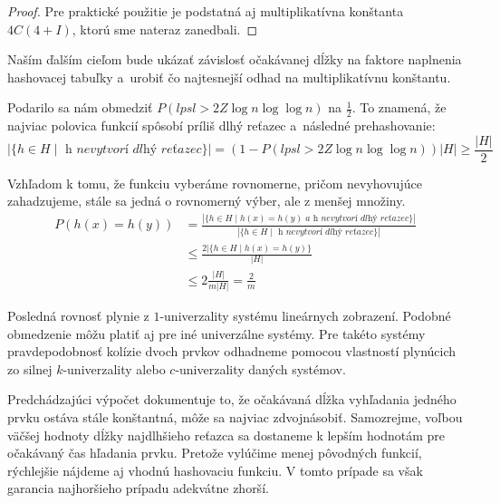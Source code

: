 \begin{proof}
Pre praktické použitie je podstatná aj multiplikatívna konštanta $4C(4 + I)$, ktorú sme nateraz zanedbali.
\end{proof}

Naším ďalším cieľom bude ukázať závislosť očakávanej dĺžky na faktore naplnenia hashovacej tabuľky a~urobiť čo najtesnejší odhad na multiplikatívnu konštantu.

Podarilo sa nám obmedziť $P(lpsl > 2Z \log n \log \log n)$ na $\frac{1}{2}$. To znamená, že najviac polovica funkcií spôsobí príliš dlhý reťazec a~následné prehashovanie:
\begin{displaymath}
|\lbrace h \in H \mid \textit{ h nevytvorí dlhý reťazec} \rbrace| = \left(1 - P(lpsl > 2Z \log n \log \log n)\right) |H| \geq \frac{|H|}{2}
\end{displaymath}

Vzhľadom k tomu, že funkciu vyberáme rovnomerne, pričom nevyhovujúce zahadzujeme, stále sa jedná o rovnomerný výber, ale z menšej množiny.
\begin{displaymath}
\begin{split}
P(h(x) = h(y)) 
	& =  \frac{|\lbrace h \in H \mid h(x) = h(y) \textit{ a~h nevytvorí dlhý reťazec} \rbrace |}{|\lbrace h \in H \mid \textit{ h nevytvorí dlhý reťazec} \rbrace|} \\
	& \leq \frac{2 |\lbrace h \in H \mid h(x) = h(y) \rbrace}{|H|} \\
	& \leq 2 \frac{|H|}{m |H|} = \frac{2}{m}
\end{split}
\end{displaymath}

Posledná rovnosť plynie z $1$-univerzality systému lineárnych zobrazení. Podobné obmedzenie môžu platiť aj pre iné univerzálne systémy. Pre takéto systémy pravdepodobnosť kolízie dvoch prvkov odhadneme pomocou vlastností plynúcich zo silnej $k$-univerzality alebo $c$-univerzality daných systémov.

Predchádzajúci výpočet dokumentuje to, že očakávaná dĺžka vyhľadania jedného prvku ostáva stále konštantná, môže sa najviac zdvojnásobiť. Samozrejme, voľbou väčšej hodnoty dĺžky najdlhšieho reťazca sa dostaneme k lepším hodnotám pre očakávaný čas hľadania prvku. Pretože vylúčime menej pôvodných funkcií, rýchlejšie nájdeme aj vhodnú hashovaciu funkciu. V tomto prípade sa však garancia najhoršieho prípadu adekvátne zhorší. 
